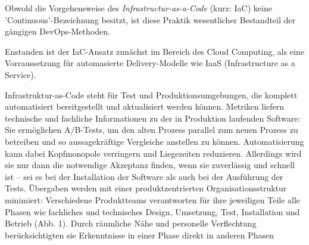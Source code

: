 Obwohl die Vorgehensweise des \textit{Infrastructur-as-a-Code} (kurz: IaC) keine 'Continuous'-Bezeichnung besitzt, ist diese Praktik wesentlicher Bestandteil der gängigen DevOps-Methoden. 

Enstanden ist der IaC-Ansatz zunächst im Bereich des Cloud Computing, als eine Vorraussetzung für automasierte Delivery-Modelle wie IaaS (Infrastructure as a Service). 












Infrastruktur-as-Code steht für Test und Produktionsumgebungen, die komplett automatisiert bereitgestellt und aktualisiert werden
können. Metriken liefern technische und fachliche Informationen zu der in Produktion laufenden
Software: Sie ermöglichen A/B-Tests, um den alten
Prozess parallel zum neuen Prozess zu betreiben und
so aussagekräftige Vergleiche anstellen zu können.
Automatisierung kann dabei Kopfmonopole
verringern und Liegezeiten reduzieren. Allerdings
wird sie nur dann die notwendige Akzeptanz finden, wenn sie zuverlässig und schnell ist – sei es
bei der Installation der Software als auch bei der
Ausführung der Tests.
Übergaben werden mit einer produktzentrierten Organisationsstruktur minimiert: Verschiedene
Produktteams verantworten für ihre jeweiligen Teile
alle Phasen wie fachliches und technisches Design,
Umsetzung, Test, Installation und Betrieb (Abb. 1).
Durch räumliche Nähe und personelle Verflechtung
berücksichtigten sie Erkenntnisse in einer Phase
direkt in anderen Phasen






